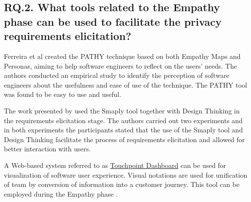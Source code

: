 \documentclass[conference]{IEEEtran}
\begin{document}
\subsection{RQ.2. What tools related to the Empathy phase can be used to facilitate the privacy requirements elicitation?}



Ferreira et al \cite{DBLP:conf/hci/FerreiraBC16} created the PATHY technique based on both Empathy Maps and Personas, aiming to help software engineers to reflect on the users' needs. The authors conducted an empirical study to identify the perception of software engineers about the usefulness and ease of use of the technique. The PATHY tool was found to be easy to use and useful.


The work presented by \cite{DBLP:conf/hci/ChasanidouGL15} used the Smaply tool together with Design Thinking in the requirements elicitation stage. The authors carried out two experiments and in both experiments the participants stated that the use of the Smaply tool and Design Thinking facilitate the process of requirements elicitation and allowed for better interaction with users.

A Web-based system referred to as \href{www.touchpointdashboard.com}{Touchpoint Dashboard} can be used for visualization of software user experience. Visual notations are used for unification of team by conversion of information into a customer journey.  This tool can be employed during the Empathy phase \cite{kumar2020methods}.
\end{document}
